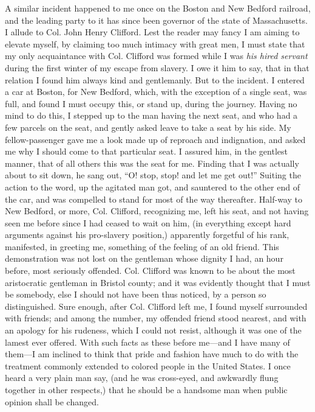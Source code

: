 A similar incident happened to me once on the Boston and New Bedford
railroad, and the leading party to it has since been governor of the
state of Massachusetts. I allude to Col. John Henry Clifford. Lest the
reader may fancy I am aiming to elevate myself, by claiming too much
intimacy with great men, I must state that my only acquaintance with
Col. Clifford was formed while I was \emph{his hired servant} during the
first winter of my escape from slavery. I owe it him to say, that in
that relation I found him {\protect\hypertarget{404}{}{}}always kind and
gentlemanly. But to the incident. I entered a car at Boston, for New
Bedford, which, with the exception of a single seat, was full, and found
I must occupy this, or stand up, during the journey. Having no mind to
do this, I stepped up to the man having the next seat, and who had a few
parcels on the seat, and gently asked leave to take a seat by his side.
My fellow-passenger gave me a look made up of reproach and indignation,
and asked me why I should come to that particular seat. I assured him,
in the gentlest manner, that of all others this was the seat for me.
Finding that I was actually about to sit down, he sang out, ``O! stop,
stop! and let me get out!'' Suiting the action to the word, up the
agitated man got, and sauntered to the other end of the car, and was
compelled to stand for most of the way thereafter. Half-way to New
Bedford, or more, Col. Clifford, recognizing me, left his seat, and not
having seen me before since I had ceased to wait on him, (in everything
except hard arguments against his pro-slavery position,) apparently
forgetful of his rank, manifested, in greeting me, something of the
feeling of an old friend. This demonstration was not lost on the
gentleman whose dignity I had, an hour before, most seriously offended.
Col. Clifford was known to be about the most aristocratic gentleman in
Bristol county; and it was evidently thought that I must be somebody,
else I should not have been thus noticed, by a person so distinguished.
Sure enough, after Col. Clifford left me, I found myself surrounded with
friends; and among the number, my offended friend stood nearest, and
with an apology for his rudeness, {\protect\hypertarget{405}{}{}}which I
could not resist, although it was one of the lamest ever offered. With
such facts as these before me---and I have many of them---I am inclined
to think that pride and fashion have much to do with the treatment
commonly extended to colored people in the United States. I once heard a
very plain man say, (and he was cross-eyed, and awkwardly flung together
in other respects,) that he should be a handsome man when public opinion
shall be changed.

